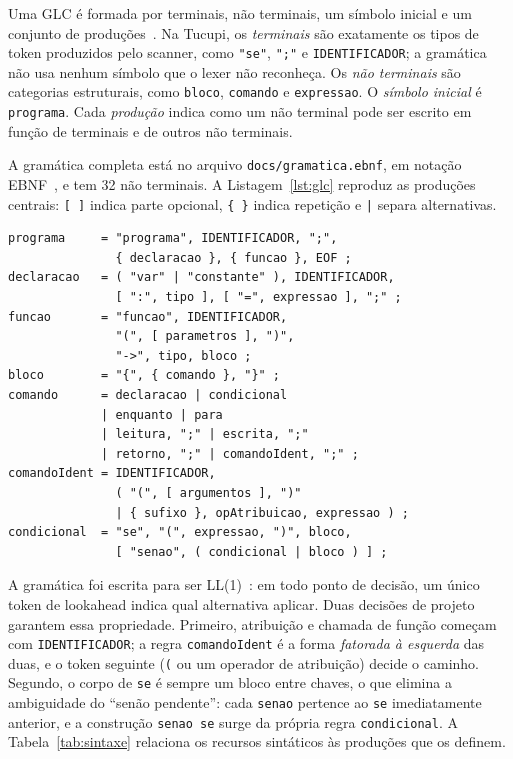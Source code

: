 \documentclass[conference,a4paper]{IEEEtran}
\newcommand{\cod}[1]{\texttt{#1}}
\begin{document}
Uma GLC é formada por terminais, não terminais, um símbolo inicial e um conjunto de produções~\cite{chomsky1956}. Na Tucupi, os \emph{terminais} são exatamente os tipos de token produzidos pelo scanner, como \cod{"se"}, \cod{";"} e \cod{IDENTIFICADOR}; a gramática não usa nenhum símbolo que o lexer não reconheça. Os \emph{não terminais} são categorias estruturais, como \cod{bloco}, \cod{comando} e \cod{expressao}. O \emph{símbolo inicial} é \cod{programa}. Cada \emph{produção} indica como um não terminal pode ser escrito em função de terminais e de outros não terminais.

A gramática completa está no arquivo \cod{docs/gramatica.ebnf}, em notação EBNF~\cite{iso14977}, e tem 32 não terminais. A Listagem~\ref{lst:glc} reproduz as produções centrais: \cod{[ ]} indica parte opcional, \cod{\{ \}} indica repetição e \cod{|} separa alternativas.

\begin{lstlisting}[float=tb,basicstyle=\ttfamily\scriptsize,caption={Produções centrais da GLC (recorte de docs/gramatica.ebnf)},label={lst:glc}]
programa     = "programa", IDENTIFICADOR, ";",
               { declaracao }, { funcao }, EOF ;
declaracao   = ( "var" | "constante" ), IDENTIFICADOR,
               [ ":", tipo ], [ "=", expressao ], ";" ;
funcao       = "funcao", IDENTIFICADOR,
               "(", [ parametros ], ")",
               "->", tipo, bloco ;
bloco        = "{", { comando }, "}" ;
comando      = declaracao | condicional
             | enquanto | para
             | leitura, ";" | escrita, ";"
             | retorno, ";" | comandoIdent, ";" ;
comandoIdent = IDENTIFICADOR,
               ( "(", [ argumentos ], ")"
               | { sufixo }, opAtribuicao, expressao ) ;
condicional  = "se", "(", expressao, ")", bloco,
               [ "senao", ( condicional | bloco ) ] ;
\end{lstlisting}

A gramática foi escrita para ser LL(1)~\cite{lewis1968,knuth1971}: em todo ponto de decisão, um único token de lookahead indica qual alternativa aplicar. Duas decisões de projeto garantem essa propriedade. Primeiro, atribuição e chamada de função começam com \cod{IDENTIFICADOR}; a regra \cod{comandoIdent} é a forma \emph{fatorada à esquerda} das duas, e o token seguinte (\cod{(} ou um operador de atribuição) decide o caminho. Segundo, o corpo de \cod{se} é sempre um bloco entre chaves, o que elimina a ambiguidade do ``senão pendente'': cada \cod{senao} pertence ao \cod{se} imediatamente anterior, e a construção \cod{senao se} surge da própria regra \cod{condicional}. A Tabela~\ref{tab:sintaxe} relaciona os recursos sintáticos às produções que os definem.
\end{document}
